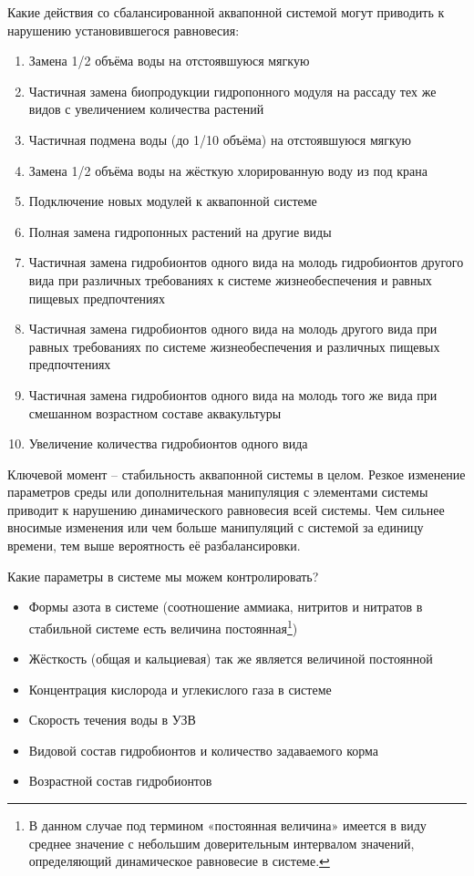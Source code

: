 
Какие действия со сбалансированной аквапонной системой могут приводить к нарушению установившегося равновесия:

\begin{enumerate}
    \item Замена 1/2 объёма воды на отстоявшуюся мягкую
    \item Частичная замена биопродукции гидропонного модуля на рассаду тех же видов с увеличением количества растений
    \item Частичная подмена воды (до 1/10 объёма) на отстоявшуюся мягкую
    \item Замена 1/2 объёма воды на жёсткую хлорированную воду из под крана
    \item Подключение новых модулей к аквапонной системе
    \item Полная замена гидропонных растений на другие виды
    \item Частичная замена гидробионтов одного вида на молодь гидробионтов другого вида при различных требованиях к системе жизнеобеспечения и равных пищевых предпочтениях
    \item Частичная замена гидробионтов одного вида на молодь другого вида при равных требованиях по системе жизнеобеспечения и различных пищевых предпочтениях
    \item Частичная замена гидробионтов одного вида на молодь того же вида при смешанном возрастном составе аквакультуры
    \item Увеличение количества гидробионтов одного вида
\end{enumerate}

\explanationSection

Ключевой момент – стабильность аквапонной системы в целом. Резкое изменение параметров среды или дополнительная манипуляция с элементами системы приводит к нарушению динамического равновесия всей системы. Чем сильнее вносимые изменения или чем больше манипуляций с системой за единицу времени, тем выше вероятность её разбалансировки.

Какие параметры в системе мы можем контролировать? 
\begin{itemize}
    \item Формы азота в системе (соотношение аммиака, нитритов и нитратов в стабильной системе есть величина постоянная\footnote{В данном случае под термином «постоянная величина» имеется в виду среднее значение с небольшим доверительным интервалом значений, определяющий динамическое равновесие в системе.})
    \item Жёсткость (общая и кальциевая) так же является величиной постоянной
    \item Концентрация кислорода и углекислого газа в системе
    \item Скорость течения воды в УЗВ
    \item Видовой состав гидробионтов и количество задаваемого корма
    \item Возрастной состав гидробионтов
\end{itemize}

